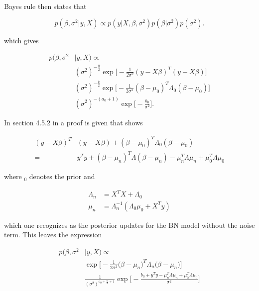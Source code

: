{{Bayes rule then states that 

$$
p({\beta},\sigma^{2}|y ,X) \propto p(y|X,\beta,\sigma^{2})p(\beta|\sigma^{2})p(\sigma^{2}).
$$

which gives

\begin{equation}
    \begin{split}
        p(\beta, \sigma^2&|y,X) \propto \\
        &(\sigma ^2)^{-\frac {n}{2}}\exp\Big[-\frac{1}{2\sigma^2}(y-X \beta)^T(y -X\beta)\Big]\\
        &(\sigma^2)^{-\frac{k}{2}}\exp\Big[-\frac {1}{2{\sigma }^2}(\beta-\mu_0)^{T}{\Lambda }_0(\beta-\mu_0)\Big]\\
        &(\sigma^2)^{-(a_0+1)}\exp\Big[-\frac{b_0}{\sigma^2}\Big].
    \end{split}
\end{equation}

In section 4.5.2 in \cite{fahrmeir_2013} a proof is given that shows

\begin{equation}
    \begin{split}
        (y-X\beta)^T&(y-X\beta) + (\beta-\mu_0)^T\Lambda_0(\beta-\mu_0) \\
        = &y^Ty + (\beta - \mu_n)^T\Lambda(\beta-\mu_n) - \mu_n^T\Lambda\mu_n + \mu_0^T\Lambda\mu_0
    \end{split}
\end{equation}

where $_0$ denotes the prior and 

\begin{align*}
    \Lambda_{n} & = X^TX + \Lambda_{0} \\
    \mu_{n}     & = \Lambda_{n}^{-1}(\Lambda_{0}\mu_{0} + X^Ty)
\end{align*}

which one recognizes as the posterior updates for the BN model without the noise term. This leaves the expression

\begin{equation}
    \begin{split}
        p(\beta, \sigma^2&|y,X) \propto \\
        & \exp\bigg[-\frac{1}{2\sigma^2}\Big(\beta-\mu_n\Big)^T\Lambda_n\Big(\beta-\mu_n\Big)\bigg] \\
        &\frac{1}{(\sigma^2)^{a_0+\frac{n}{2}+1}}\exp\bigg[-\frac{b_0+y^Ty  - \mu_n^T\Lambda\mu_n + \mu_0^T\Lambda\mu_0}{\sigma^2}\bigg]
    \end{split}
\end{equation}

}}
